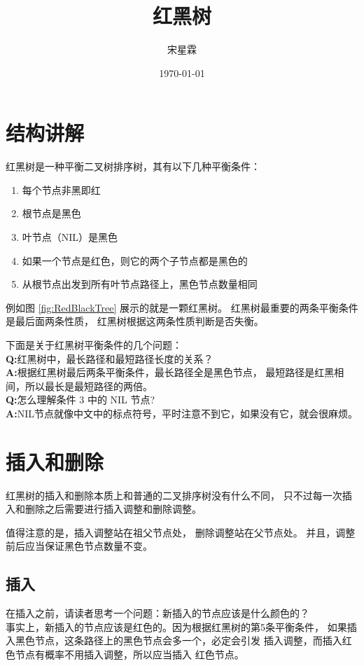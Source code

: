 \documentclass{note}
\title{红黑树}
\author{宋星霖}
\date{\today}
\begin{document}
\maketitle
\section{结构讲解}
红黑树是一种平衡二叉树排序树，其有以下几种平衡条件：
\begin{enumerate}
    \item 每个节点非黑即红
    \item 根节点是黑色
    \item 叶节点（NIL）是黑色
    \item 如果一个节点是红色，则它的两个子节点都是黑色的
    \item 从根节点出发到所有叶节点路径上，黑色节点数量相同
\end{enumerate}
例如图 \ref{fig:RedBlackTree} 展示的就是一颗红黑树。
红黑树最重要的两条平衡条件是最后面两条性质，
红黑树根据这两条性质判断是否失衡。

下面是关于红黑树平衡条件的几个问题：\\
\textbf{Q:}红⿊树中，最长路径和最短路径长度的关系？\\
\textbf{A:}根据红黑树最后两条平衡条件，最长路径全是黑色节点，
最短路径是红黑相间，所以最长是最短路径的两倍。\\
\textbf{Q:}怎么理解条件 3 中的 NIL 节点?\\
\textbf{A:}NIL节点就像中文中的标点符号，平时注意不到它，如果没有它，就会很麻烦。

\section{插入和删除}
红黑树的插入和删除本质上和普通的二叉排序树没有什么不同，
只不过每一次插入和删除之后需要进行插入调整和删除调整。

值得注意的是，插入调整站在祖父节点处，
删除调整站在父节点处。
并且，调整前后应当保证黑色节点数量不变。

\subsection{插入\cite{insert}}
在插入之前，请读者思考一个问题：新插入的节点应该是什么颜色的？\\
事实上，新插入的节点应该是红色的。因为根据红黑树的第5条平衡条件，
如果插入黑色节点，这条路径上的黑色节点会多一个，必定会引发
插入调整，而插入红色节点有概率不用插入调整，所以应当插入
红色节点。
\end{document}
